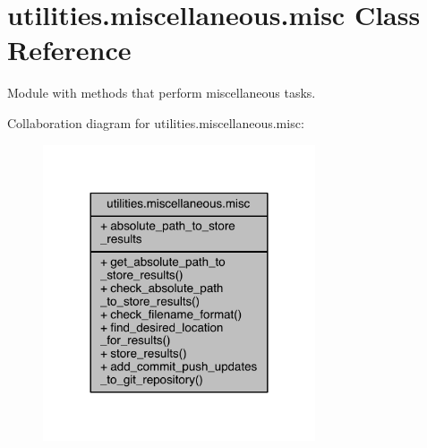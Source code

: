 \hypertarget{classutilities_1_1miscellaneous_1_1misc}{}\section{utilities.\+miscellaneous.\+misc Class Reference}
\label{classutilities_1_1miscellaneous_1_1misc}


Module with methods that perform miscellaneous tasks.  




Collaboration diagram for utilities.\+miscellaneous.\+misc\+:
\nopagebreak
\begin{figure}[H]
\begin{center}
\leavevmode
\includegraphics[width=228pt]{d9/d28/classutilities_1_1miscellaneous_1_1misc__coll__graph}
\end{center}
\end{figure}

